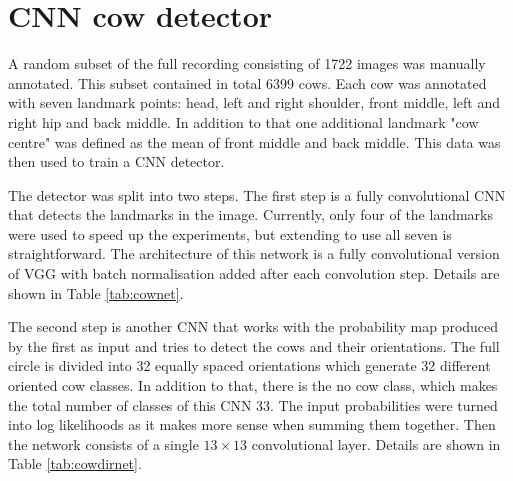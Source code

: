 \documentclass[10pt,a4paper,twocolumn]{article}
\begin{document}
\section{CNN cow detector}

A random subset of the full recording consisting of 1722 images was manually annotated. This subset contained in total 6399 cows. Each cow was annotated with seven landmark points: head, left and right shoulder, front middle, left and right hip and back middle. In addition to that one additional landmark "cow centre" was defined as the mean of front middle and back middle. This data was then used to train a CNN detector.

The detector was split into two steps. The first step is a fully convolutional CNN that detects the landmarks in the image. Currently, only four of the landmarks were used to speed up the experiments, but extending to use all seven is straightforward. The architecture of this network is a fully convolutional version of VGG \cite{Simonyan14c} with batch normalisation \cite{DBLP:journals/corr/IoffeS15} added after each convolution step. Details are shown in Table \ref{tab:cownet}.

The second step is another CNN that works with the probability map produced by the first as input and tries to detect the cows and their orientations. The full circle is divided into 32 equally spaced orientations which generate 32 different oriented cow classes. In addition to that, there is the no cow class, which makes the total number of classes of this CNN 33. The input probabilities were turned into log likelihoods as it makes more sense when summing them together. Then the network consists of a single $ 13 \times 13 $ convolutional layer. Details are shown in Table \ref{tab:cowdirnet}.
\end{document}

